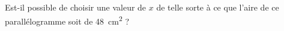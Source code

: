 
\begin{exercice}\label{exo2smath-0271}

    Est-il possible de choisir une valeur de \( x\) de telle sorte à ce que l'aire de ce parallélogramme soit de \SI{48}{\centi\meter\squared} ?

\begin{center}
   
\end{center}


\end{exercice}
